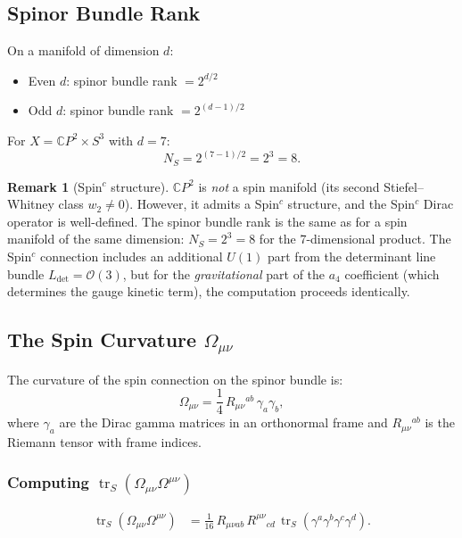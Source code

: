 \documentclass[12pt,a4paper]{article}
\theoremstyle{definition}
\newtheorem{remark}{Remark}
\DeclareMathOperator{\tr}{tr}
\begin{document}
\subsection{Spinor Bundle Rank}

On a manifold of dimension $d$:
\begin{itemize}
\item Even $d$: spinor bundle rank $= 2^{d/2}$
\item Odd $d$: spinor bundle rank $= 2^{(d-1)/2}$
\end{itemize}

For $X = \mathbb{C}P^2 \times S^3$ with $d = 7$:
\begin{equation}\label{eq:NS}
\boxed{N_S = 2^{(7-1)/2} = 2^3 = 8.}
\end{equation}

\begin{remark}[Spin$^c$ structure]
$\mathbb{C}P^2$ is \emph{not} a spin manifold (its second
Stiefel--Whitney class $w_2 \neq 0$).  However, it admits a
Spin$^c$ structure, and the Spin$^c$ Dirac operator is
well-defined.  The spinor bundle rank is the same as for a spin
manifold of the same dimension: $N_S = 2^3 = 8$ for the
7-dimensional product.  The Spin$^c$ connection includes an
additional $U(1)$ part from the determinant line bundle $L_{\det} =
\mathcal{O}(3)$, but for the \emph{gravitational} part of the $a_4$
coefficient (which determines the gauge kinetic term), the
computation proceeds identically.
\end{remark}


\subsection{The Spin Curvature $\Omega_{\mu\nu}$}
\label{sec:spin-curvature}

The curvature of the spin connection on the spinor bundle is:
\begin{equation}\label{eq:Omega-spin}
\Omega_{\mu\nu} = \frac{1}{4}\,R_{\mu\nu}{}^{ab}\,\gamma_a\gamma_b,
\end{equation}
where $\gamma_a$ are the Dirac gamma matrices in an orthonormal
frame and $R_{\mu\nu}{}^{ab}$ is the Riemann tensor with frame
indices.

\subsubsection{Computing $\tr_S(\Omega_{\mu\nu}\Omega^{\mu\nu})$}

\begin{align}
\tr_S(\Omega_{\mu\nu}\Omega^{\mu\nu})
  &= \frac{1}{16}\,R_{\mu\nu ab}\,R^{\mu\nu}{}_{cd}\,
  \tr_S(\gamma^a\gamma^b\gamma^c\gamma^d). \label{eq:OmOm1}
\end{align}
\end{document}
